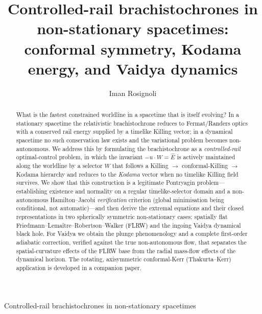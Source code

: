 \documentclass[12pt]{iopart}
\newcommand{\Ehat}{\hat E}
\begin{document}
\title{Controlled-rail brachistochrones in non-stationary spacetimes:
conformal symmetry, Kodama energy, and Vaidya dynamics}

\author{Iman Rosignoli}
\address{Department of Physics, University of Pavia, Via A.\ Bassi 6, 27100 Pavia, Italy}

\begin{abstract}
What is the fastest constrained worldline in a spacetime that is itself evolving? In a
stationary spacetime the relativistic brachistochrone reduces to Fermat/Randers optics
with a conserved rail energy supplied by a timelike Killing vector; in a dynamical
spacetime no such conservation law exists and the variational problem becomes
non-autonomous. We address this by formulating the brachistochrone as a
\emph{controlled-rail} optimal-control problem, in which the invariant $-u\cdot W=\Ehat$ is
actively maintained along the worldline by a selector $W$ that follows a Killing $\to$
conformal-Killing $\to$ Kodama hierarchy and reduces to the \emph{Kodama} vector when no
timelike Killing field survives. We show that this construction is a legitimate
Pontryagin problem---establishing existence and normality on a regular timelike-selector
domain and a non-autonomous Hamilton--Jacobi \emph{verification} criterion (global
minimisation being conditional, not automatic)---and then derive the extremal equations
and their closed representations in two spherically symmetric non-stationary cases:
spatially flat Friedmann--Lema\^itre--Robertson--Walker (FLRW) and the ingoing Vaidya
dynamical black hole. For Vaidya we obtain the plunge phenomenology and a complete
first-order adiabatic correction, verified against the true non-autonomous flow, that
separates the spatial-curvature effects of the FLRW base from the radial mass-flow effects
of the dynamical horizon. The rotating, axisymmetric conformal-Kerr (Thakurta--Kerr)
application is developed in a companion paper.
\end{abstract}

\maketitle
%
         {Controlled-rail brachistochrones in non-stationary spacetimes}
\end{document}

